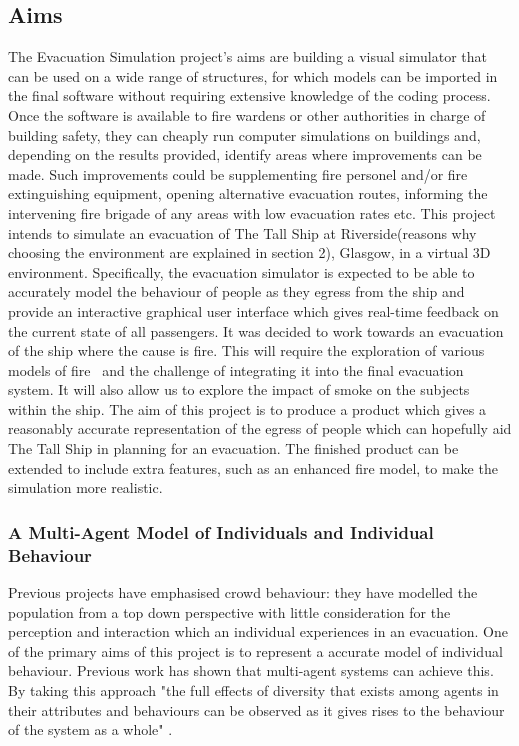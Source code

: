 \documentclass[a4paper,10pt]{article}
\begin{document}
\subsection{Aims}
The Evacuation Simulation project’s aims are building a visual simulator that
can be used on a wide range of structures, for which models can be imported in
the final software without requiring extensive knowledge of the coding process.
Once the software is available to fire wardens or other authorities in charge of
building safety, they can cheaply run computer simulations on buildings and,
depending on the results provided, identify areas where improvements can be
made. Such improvements could be supplementing fire personel and/or fire
extinguishing equipment, opening alternative evacuation routes,
informing the intervening fire brigade of any areas with low evacuation rates etc.
This project intends to simulate an evacuation of The Tall Ship at Riverside(reasons why choosing the environment are explained in section 2),
Glasgow, in a virtual 3D environment. 
Specifically, the evacuation simulator is
expected to be able to accurately model the behaviour of people as they egress
from the ship and provide an interactive graphical user interface which gives
real-time feedback on the current state of all passengers.
It was decided to work towards an evacuation of the ship where the cause is
fire. This will require the exploration of various models of fire~\cite{fireEvacuationProcedure} and the challenge
of integrating it into the final evacuation system. It will also allow us to explore
the impact of smoke on the subjects within the ship.
The aim of this project is to produce a product which gives a
reasonably accurate representation of the egress of people which can hopefully
aid The Tall Ship in planning for an evacuation. The finished product can be
extended to include extra features, such as an enhanced fire model, to make the
simulation more realistic.

\subsubsection{A Multi-Agent Model of Individuals and Individual Behaviour}
Previous projects have emphasised crowd behaviour: they have modelled the population from a top down 
perspective with little consideration for the perception and interaction which an individual experiences in an evacuation.
One of the primary aims of this project is to represent a accurate model of individual behaviour.
Previous work has shown that multi-agent systems can achieve this. By taking this approach "the full effects of diversity that exists among agents in their attributes and behaviours can be observed as it
gives rises to the behaviour of the system as a whole" \cite{AgentBasedTutorial}.
\end{document}
